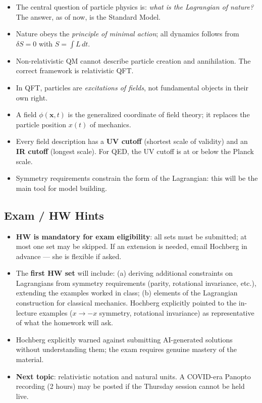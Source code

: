 \begin{itemize}
  \item The central question of particle physics is: \emph{what is
    the Lagrangian of nature?}  The answer, as of now, is the Standard
    Model.
  \item Nature obeys the \emph{principle of minimal action}; all
    dynamics follows from $\delta S = 0$ with
    $S = \int L\,dt$.
  \item Non-relativistic QM cannot describe particle creation and
    annihilation.  The correct framework is relativistic QFT.
  \item In QFT, particles are \emph{excitations of fields}, not
    fundamental objects in their own right.
  \item A field $\phi(\mathbf{x},t)$ is the generalized coordinate of
    field theory; it replaces the particle position $x(t)$ of mechanics.
  \item Every field description has a \textbf{UV cutoff} (shortest
    scale of validity) and an \textbf{IR cutoff} (longest scale).  For
    QED, the UV cutoff is at or below the Planck scale.
  \item Symmetry requirements constrain the form of the Lagrangian:
    this will be the main tool for model building.
\end{itemize}

\subsection*{Exam / HW Hints}

\begin{itemize}
  \item \textbf{HW is mandatory for exam eligibility}: all sets must
    be submitted; at most one set may be skipped.  If an extension is
    needed, email Hochberg in advance — she is flexible if asked.
  \item The \textbf{first HW set} will include: (a) deriving
    additional constraints on Lagrangians from symmetry requirements
    (parity, rotational invariance, etc.), extending the examples
    worked in class; (b) elements of the Lagrangian construction for
    classical mechanics.  Hochberg explicitly pointed to the
    in-lecture examples ($x\to -x$ symmetry, rotational invariance)
    as representative of what the homework will ask.
  \item Hochberg explicitly warned against submitting AI-generated
    solutions without understanding them; the exam requires genuine
    mastery of the material.
  \item \textbf{Next topic}: relativistic notation and natural units.
    A COVID-era Panopto recording (2 hours) may be posted if the
    Thursday session cannot be held live.
\end{itemize}

